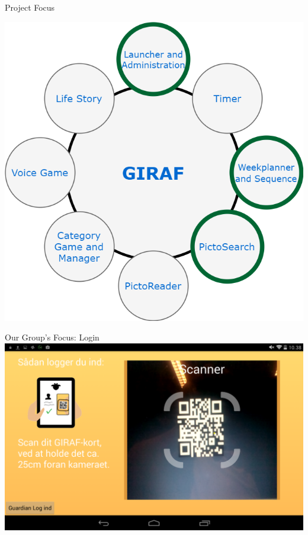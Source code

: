 \begin{frame}{Project Focus}
\begin{center}
\begin{minipage}[H]{0.9\linewidth}
\includegraphics[scale=0.32]{figures/GirafFocus.png} 
\end{minipage}
\end{center}
\end{frame}

\begin{frame}{Our Group's Focus: Login}
\includegraphics[scale=0.21]{figures/Login.png} 
\end{frame}

